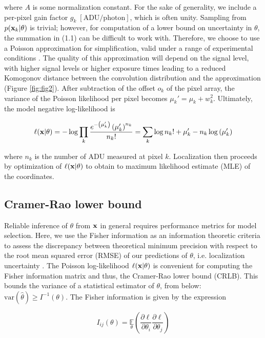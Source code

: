 where $A$ is some normalization constant. For the sake of generality, we include a per-pixel gain factor $g_{k} \; [\mathrm{ADU}/\mathrm{photon}]$, which is often unity. Sampling from $p(\bold{x}_{k}\lvert\theta)$ is trivial; however, for computation of a lower bound on uncertainty in $\theta$, the summation in (1.1) can be difficult to work with. Therefore, we choose to use a Poisson approximation for simplification, valid under a range of experimental conditions \parencite{Huang2013}. The quality of this approximation will depend on the signal level, with higher signal levels or higher exposure times leading to a reduced Komogonov distance between the convolution distribution and the approximation (Figure \ref{fig:fig2}). After subtraction of the offset $o_{k}$ of the pixel array, the variance of the Poisson likelihood per pixel  becomes $\mu_{k}' = \mu_{k} + w_{k}^{2}$. Ultimately, the model negative log-likelihood is

\begin{equation}
\ell(\bold{x}\lvert\theta) = -\log \prod_{k} \frac{e^{-\left(\mu_{k}'\right)}\left(\mu_{k}'\right)^{n_{k}}}{n_{k}!} = \sum_{k}  \log n_{k}! + \mu_{k}' - n_{k}\log\left(\mu_{k}'\right)
\end{equation}

where $n_{k}$ is the number of ADU measured at pixel $k$. Localization then proceeds by optimization of $\ell(\bold{x}\lvert\theta)$ to obtain to maximum likelihood estimate (MLE) of the coordinates. 

\subsection{Cramer-Rao lower bound}

Reliable inference of $\theta$ from $\bold{x}$ in general requires performance metrics for model selection. Here, we use the Fisher information as an information theoretic criteria to assess the discrepancy between theoretical minimum precision with respect to the root mean squared error (RMSE) of our predictions of $\theta$, i.e. localization uncertainty \parencite{Chao2016}. The Poisson log-likelihood $\ell(\bold{x}\lvert\theta)$ is convenient for computing the Fisher information matrix \parencite{Smith2010} and thus, the Cramer-Rao lower bound (CRLB). This bounds the variance of a statistical estimator of $\theta$, from below: $\mathrm{var}(\hat{\theta}) \geq I^{-1}(\theta)$. The Fisher information is given by the expression

\begin{equation}
I_{ij}(\theta) = \underset{\theta}{\mathbb{E}}\left(\frac{\partial \ell}{\partial\theta_{i}}\frac{\partial\ell}{\partial\theta_{j}}\right) 
\end{equation}

